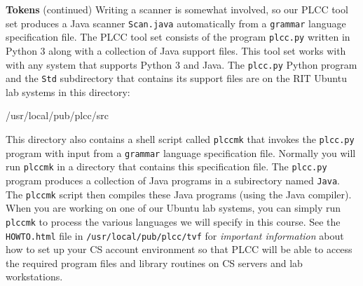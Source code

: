 \begin{minipage}[t]{\sw}
\slidenumber
\LARGE
{\bf Tokens} (continued)\exx
Writing a scanner is somewhat involved,
so our PLCC tool set produces
a Java scanner \verb'Scan.java' automatically
from a \verb'grammar' language specification file.
The PLCC tool set consists
of the program \verb'plcc.py' written in Python 3
along with a collection of Java support files.
This tool set works with with any system
that supports Python 3 and Java.\exx
The \verb'plcc.py' Python program
and the \verb'Std' subdirectory that contains its support files
are on the RIT Ubuntu lab systems in this directory:
{\Large
\begin{qv}
/usr/local/pub/plcc/src
\end{qv}
}
This directory also contains a shell script called \verb'plccmk'
that invokes the \verb'plcc.py' program with input
from a \verb'grammar' language specification file.
Normally you will run \verb'plccmk' in a directory
that contains this specification file.
The \verb'plcc.py' program produces a collection of Java programs
in a subirectory named \verb'Java'.
The \verb'plccmk' script then compiles these Java programs
(using the Java compiler).
When you are working on one of our Ubuntu lab systems,
you can simply run \verb'plccmk'
to process the various languages we will specify in this course.\exx
See the \verb'HOWTO.html' file in \verb'/usr/local/pub/plcc/tvf'
for {\em important information} about how
to set up your CS account environment
so that PLCC will be able to access the required program files
and library routines on CS servers and lab workstations.
\end{minipage}
\clearpage
